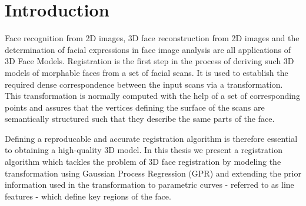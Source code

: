 \chapter{Introduction}
\begin{comment}3D Face Models have a wide variety of applications. They are used in\end{comment}
Face recognition from 2D images, 3D face reconstruction from 2D images and the determination of facial expressions in face image analysis are all applications of 3D Face Models. Registration is the first step in the process of deriving such 3D models of morphable faces from a set of facial scans. It is used to establish the required dense correspondence between the input scans via a transformation. This transformation is normally computed with the help of a set of corresponding
points and assures that the vertices defining the surface of the scans are semantically structured such that they describe the same parts of the face. \begin{comment}Correspondence betweenk two faces is established by deforming a template face on to a target face.\end{comment} Defining a reproducable and accurate registration algorithm is therefore essential to obtaining a high-quality 3D model. 
In this thesis we present a registration algorithm which tackles the problem of 3D face registration by modeling the transformation using Gaussian Process Regression (GPR) and extending the prior information used in the transformation to parametric curves - referred to as line features - which define key regions of the face.

